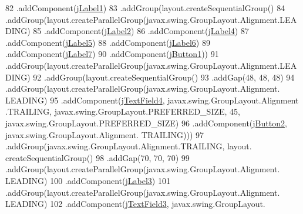 \begin{DoxyCode}
82                     .addComponent(\mbox{\hyperlink{classsoftware_1_1ponernotas_ac17144972e22b9105abd7154befd195a}{jLabel1}})
83                     .addGroup(layout.createSequentialGroup()
84                         .addGroup(layout.createParallelGroup(javax.swing.GroupLayout.Alignment.LEADING)
85                             .addComponent(\mbox{\hyperlink{classsoftware_1_1ponernotas_ab381c20a9538313f7d4a5b39b0a96325}{jLabel2}})
86                             .addComponent(\mbox{\hyperlink{classsoftware_1_1ponernotas_a85fb8af1244048f39a9d8864e8ef6744}{jLabel4}})
87                             .addComponent(\mbox{\hyperlink{classsoftware_1_1ponernotas_ab1d9cabe505eb0024a31ce142ab2ca0d}{jLabel5}})
88                             .addComponent(\mbox{\hyperlink{classsoftware_1_1ponernotas_ac94bb41bd989a69788d89b0522ecba91}{jLabel6}})
89                             .addComponent(\mbox{\hyperlink{classsoftware_1_1ponernotas_ae60c32ed6ba0e002b935d38c6d9378a3}{jLabel7}})
90                             .addComponent(\mbox{\hyperlink{classsoftware_1_1ponernotas_ab5d7404242d2345a5e4b00f8816b4834}{jButton1}}))
91                         .addGroup(layout.createParallelGroup(javax.swing.GroupLayout.Alignment.LEADING)
92                             .addGroup(layout.createSequentialGroup()
93                                 .addGap(48, 48, 48)
94                                 .addGroup(layout.createParallelGroup(javax.swing.GroupLayout.Alignment.
      LEADING)
95                                     .addComponent(\mbox{\hyperlink{classsoftware_1_1ponernotas_a4939c719c7aae97334352b7c4d9fcbf2}{jTextField4}}, javax.swing.GroupLayout.Alignment
      .TRAILING, javax.swing.GroupLayout.PREFERRED\_SIZE, 45, javax.swing.GroupLayout.PREFERRED\_SIZE)
96                                     .addComponent(\mbox{\hyperlink{classsoftware_1_1ponernotas_a5c280378d6fe6477170e9ede3ac8ae98}{jButton2}}, javax.swing.GroupLayout.Alignment.
      TRAILING)))
97                             .addGroup(javax.swing.GroupLayout.Alignment.TRAILING, layout.
      createSequentialGroup()
98                                 .addGap(70, 70, 70)
99                                 .addGroup(layout.createParallelGroup(javax.swing.GroupLayout.Alignment.
      LEADING)
100                                     .addComponent(\mbox{\hyperlink{classsoftware_1_1ponernotas_a35f1e77968f139680ed7404f94dada6f}{jLabel3}})
101                                     .addGroup(layout.createParallelGroup(javax.swing.GroupLayout.Alignment.
      LEADING)
102                                         .addComponent(\mbox{\hyperlink{classsoftware_1_1ponernotas_a75f364eec0a40fc2d42d6387ea73baaf}{jTextField3}}, javax.swing.GroupLayout.

\end{DoxyCode}
